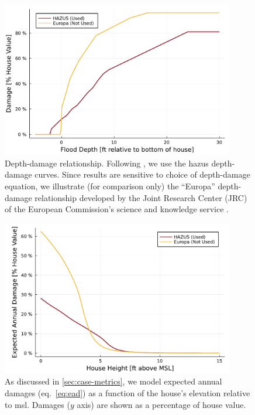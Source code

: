 \documentclass[ef,draft]{agutexSI2019}
\begin{document}
\begin{figure}
      \centering
      \includegraphics[width=4in]{cost-depth-damage}
      \caption{
            Depth-damage relationship.
            Following , we use the \gls{hazus} depth-damage curves.
            Since results are sensitive to choice of depth-damage equation, we illustrate (for comparison only) the ``Europa'' depth-damage relationship developed by the Joint Research Center (JRC) of the European Commission's science and knowledge service \cite{huizinga_depthdamage:2016}.
      }\label{fig:cost-depth-damage}
\end{figure}

\begin{figure}
      \centering
      \includegraphics[width=4in]{cost-expected-damage-emulator}
      \caption{
            As discussed in \cref{sec:case-metrics}, we model expected annual damages (eq.~\ref{eq:ead}) as a function of the house's elevation relative to \gls{msl}.
            Damages ($y$ axis) are shown as a percentage of house value.
      }\label{fig:cost-expected-damage-emulator}
\end{figure}
\end{document}
